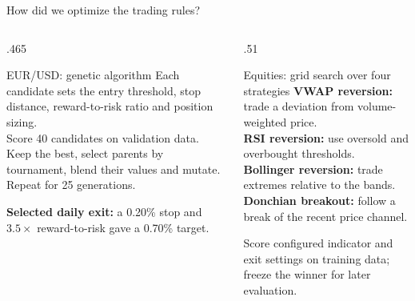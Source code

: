 \documentclass[aspectratio=169,10pt]{beamer}
\begin{document}
\begin{frame}{How did we optimize the trading rules?}
\begin{columns}[T,onlytextwidth]
\begin{column}{.465\textwidth}
\begin{block}{EUR/USD: genetic algorithm}
\small Each candidate sets the entry threshold, stop distance, reward-to-risk ratio and position sizing.\\[3pt]
Score 40 candidates on validation data. Keep the best, select parents by tournament, blend their values and mutate. Repeat for 25 generations.
\end{block}
\small\textbf{Selected daily exit:} a 0.20\% stop and $3.5\times$ reward-to-risk gave a 0.70\% target.
\end{column}
\begin{column}{.51\textwidth}
\begin{block}{Equities: grid search over four strategies}
\small\textbf{VWAP reversion:} trade a deviation from volume-weighted price.\\[2pt]
\textbf{RSI reversion:} use oversold and overbought thresholds.\\[2pt]
\textbf{Bollinger reversion:} trade extremes relative to the bands.\\[2pt]
\textbf{Donchian breakout:} follow a break of the recent price channel.
\end{block}
\small Score configured indicator and exit settings on training data; freeze the winner for later evaluation.
\end{column}
\end{columns}
\end{frame}
\end{document}
